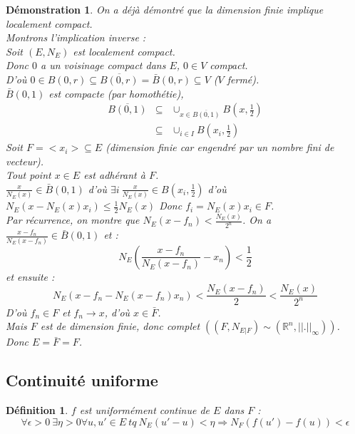 \documentclass[a4paper, oneside]{report}
\theoremstyle{break}
\newtheorem{defi}[thm]{Définition}
\newtheorem*{demo}{Démonstration}
\newcommand{\R}{\mathbb{R}}
\newcommand{\fracun}[1]{\frac{1}{#1}}
\begin{document}
\begin{demo}
On a déjà démontré que la dimension finie implique localement compact.\\
Montrons l'implication inverse :\\
Soit $(E,N_E)$ est localement compact.\\
Donc $0$ a un voisinage compact dans $E$, $0\in V$ compact.\\
D'où $0\in B(0,r)\subseteq \overline{B(0,r)} = \bar{B}(0,r) \subseteq V$ ($V$ fermé).\\
$\bar{B}(0,1)$ est compacte (par homothétie), 
$$\begin{array}{lll}
\overline{B(0,1)} &\subseteq & \cup_{x\in \overline{B(0,1)}} B(x,\fracun{2})\\
&\subseteq & \cup_{i\in I}B(x_i, \fracun{2})
\end{array}$$
Soit $F = <x_i> \subseteq E$ (dimension finie car engendré par un nombre fini de vecteur).\\
Tout point $x\in E$ est adhérant à $F$.\\
$\frac{x}{N_E(x)} \in \bar{B}(0,1)$ d'où $\exists i~\frac{x}{N_E(x)} \in B(x_i, \fracun{2})$ d'où $N_E(x-N_E(x)x_i)\leq \fracun{2}N_E(x)$
Donc $f_i = N_E(x)x_i \in F$.\\
Par récurrence, on montre que $N_E(x-f_n)<\frac{N_E(x)}{2^n}$. On a $\frac{x-f_n}{N_E(x-f_n)} \in \bar{B}(0,1)$ et :
$$N_E(\frac{x-f_n}{N_E(x-f_n)} - x_n) < \fracun{2}$$
et ensuite :
$$N_E(x-f_n-N_E(x-f_n)x_n)<\frac{N_E(x-f_n)}{2}<\frac{N_E(x)}{2^n}$$
D'où $f_n \in F$ et $f_n \rightarrow x$, d'où $x\in \bar{F}$.\\
Mais $F$ est de dimension finie, donc complet $((F,N_{E|F})\sim (\R^n,||.||_\infty))$.\\
Donc $E=\bar{F}=F$.
\end{demo}

\subsection{Continuité uniforme}

\begin{defi}
$f$ est uniformément continue de $E$ dans $F$ :
$$\forall \epsilon >0~\exists \eta >0 \forall u,u'\in E~tq~N_E(u'-u)<\eta \Rightarrow N_F(f(u')-f(u))<\epsilon$$
\end{defi}
\end{document}

